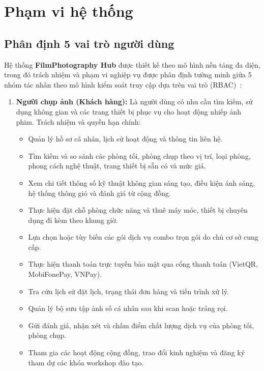 \section{Phạm vi hệ thống}

\subsection{Phân định 5 vai trò người dùng}
Hệ thống \textbf{FilmPhotography Hub} được thiết kế theo mô hình nền tảng đa diện, trong đó trách nhiệm và phạm vi nghiệp vụ được phân định tường minh giữa 5 nhóm tác nhân theo mô hình kiểm soát truy cập dựa trên vai trò (RBAC)~\cite{sandhu2023role}:

\begin{enumerate}[leftmargin=2em]
    \item \textbf{Người chụp ảnh (Khách hàng):}
    Là người dùng có nhu cầu tìm kiếm, sử dụng không gian và các trang thiết bị phục vụ cho hoạt động nhiếp ảnh phim. Trách nhiệm và quyền hạn chính:
    \begin{itemize}
        \item Quản lý hồ sơ cá nhân, lịch sử hoạt động và thông tin liên hệ.
        \item Tìm kiếm và so sánh các phòng tối, phòng chụp theo vị trí, loại phòng, phong cách nghệ thuật, trang thiết bị sẵn có và mức giá.
        \item Xem chi tiết thông số kỹ thuật không gian sáng tạo, điều kiện ánh sáng, hệ thống thông gió và đánh giá từ cộng đồng.
        \item Thực hiện đặt chỗ phòng chức năng và thuê máy móc, thiết bị chuyên dụng đi kèm theo khung giờ.
        \item Lựa chọn hoặc tùy biến các gói dịch vụ combo trọn gói do chủ cơ sở cung cấp.
        \item Thực hiện thanh toán trực tuyến bảo mật qua cổng thanh toán (VietQR, MobiFonePay, VNPay).
        \item Tra cứu lịch sử đặt lịch, trạng thái đơn hàng và tiến trình xử lý.
        \item Quản lý bộ sưu tập ảnh số cá nhân sau khi scan hoặc tráng rọi.
        \item Gửi đánh giá, nhận xét và chấm điểm chất lượng dịch vụ của phòng tối, phòng chụp.
        \item Tham gia các hoạt động cộng đồng, trao đổi kinh nghiệm và đăng ký tham dự các khóa workshop đào tạo.
    \end{itemize}


\end{enumerate}
